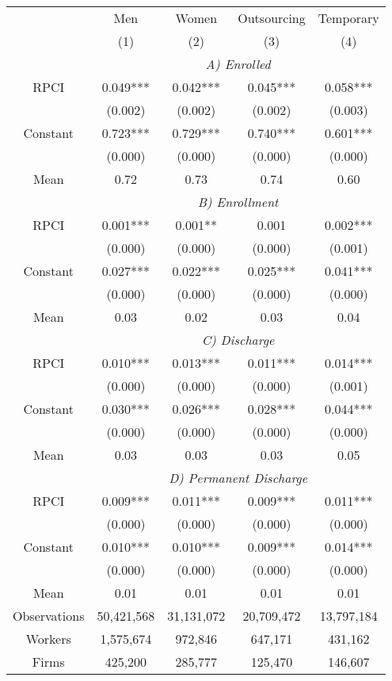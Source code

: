 \begin{tabular}{ccccc}
\toprule
\toprule
      & Men   & Women & Outsourcing & Temporary \\
      & (1)   & (2)   & (3)   & (4) \\
\cmidrule{2-5}      & \multicolumn{4}{c}{\textit{A) Enrolled}} \\
\midrule
RPCI  & 0.049*** & 0.042*** & 0.045*** & 0.058*** \\
      & (0.002) & (0.002) & (0.002) & (0.003) \\
Constant & 0.723*** & 0.729*** & 0.740*** & 0.601*** \\
      & (0.000) & (0.000) & (0.000) & (0.000) \\
Mean  & 0.72  & 0.73  & 0.74  & 0.60 \\
\cmidrule{2-5}      & \multicolumn{4}{c}{\textit{B) Enrollment}} \\
\midrule
RPCI  & 0.001*** & 0.001** & 0.001 & 0.002*** \\
      & (0.000) & (0.000) & (0.000) & (0.001) \\
Constant & 0.027*** & 0.022*** & 0.025*** & 0.041*** \\
      & (0.000) & (0.000) & (0.000) & (0.000) \\
Mean  & 0.03  & 0.02  & 0.03  & 0.04 \\
\cmidrule{2-5}      & \multicolumn{4}{c}{\textit{C) Discharge}} \\
\midrule
RPCI  & 0.010*** & 0.013*** & 0.011*** & 0.014*** \\
      & (0.000) & (0.000) & (0.000) & (0.001) \\
Constant & 0.030*** & 0.026*** & 0.028*** & 0.044*** \\
      & (0.000) & (0.000) & (0.000) & (0.000) \\
Mean  & 0.03  & 0.03  & 0.03  & 0.05 \\
\cmidrule{2-5}      & \multicolumn{4}{c}{\textit{D) Permanent Discharge}} \\
\midrule
RPCI  & 0.009*** & 0.011*** & 0.009*** & 0.011*** \\
      & (0.000) & (0.000) & (0.000) & (0.000) \\
Constant & 0.010*** & 0.010*** & 0.009*** & 0.014*** \\
      & (0.000) & (0.000) & (0.000) & (0.000) \\
Mean  & 0.01  & 0.01  & 0.01  & 0.01 \\
\midrule
Observations & 50,421,568 & 31,131,072 & 20,709,472 & 13,797,184 \\
Workers & 1,575,674 & 972,846 & 647,171 & 431,162 \\
Firms & 425,200 & 285,777 & 125,470 & 146,607 \\
\bottomrule
\bottomrule
\end{tabular}%
